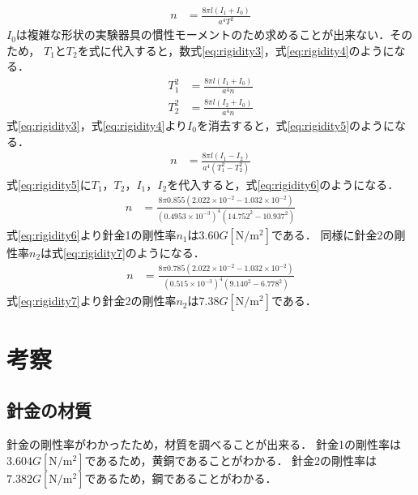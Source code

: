 \documentclass[a4paper,11pt]{ltjsarticle}
\begin{document}
\begin{align}
  n & = \frac{8 \pi l (I_1 + I_0)}{a^4 T^2} \label{eq:rigidity2}
\end{align}
$I_0$は複雑な形状の実験器具の慣性モーメントのため求めることが出来ない．そのため，
$T_1$と$T_2$を式に代入すると，数式\eqref{eq:rigidity3}，式\eqref{eq:rigidity4}のようになる．
\begin{align}
  T_1 ^2 & = \frac{8 \pi l (I_1 + I_0)}{a^4 n}\label{eq:rigidity3} \\
  T_2 ^2 & = \frac{8 \pi l (I_2 + I_0)}{a^4 n}\label{eq:rigidity4}
\end{align}
式\eqref{eq:rigidity3}，式\eqref{eq:rigidity4}より$I_0$を消去すると，式\eqref{eq:rigidity5}のようになる．
\begin{align}
  n & = \frac{8 \pi l (I_1 - I_2)}{a^4 (T_1 ^2 - T_2 ^2)} \label{eq:rigidity5}
\end{align}
式\eqref{eq:rigidity5}に$T_1$，$T_2$，$I_1$，$I_2$を代入すると，式\eqref{eq:rigidity6}のようになる．
\begin{align}
  n & = \frac{8 \pi 0.855 (2.022 \times 10^{-2} - 1.032 \times 10^{-2})}{(0.4953 \times 10^{-3})^4 (14.752^2 - 10.937^2)} \label{eq:rigidity6}
\end{align}
式\eqref{eq:rigidity6}より針金1の剛性率$n_1$は$3.60G[\mathrm{N/m^2}]$である．
同様に針金2の剛性率$n_2$は式\eqref{eq:rigidity7}のようになる．
\begin{align}
  n & = \frac{8 \pi 0.785 (2.022 \times 10^{-2} - 1.032 \times 10^{-2})}{(0.515 \times 10^{-3})^4 (9.140^2 - 6.778^2)} \label{eq:rigidity7}
\end{align}
式\eqref{eq:rigidity7}より針金2の剛性率$n_2$は$7.38G[\mathrm{N/m^2}]$である．


\section{考察}
\subsection{針金の材質}
針金の剛性率がわかったため，材質を調べることが出来る．
針金1の剛性率は$3.604G[\mathrm{N/m^2}]$であるため，黄銅であることがわかる．
針金2の剛性率は$7.382G[\mathrm{N/m^2}]$であるため，鋼であることがわかる．
\end{document}
